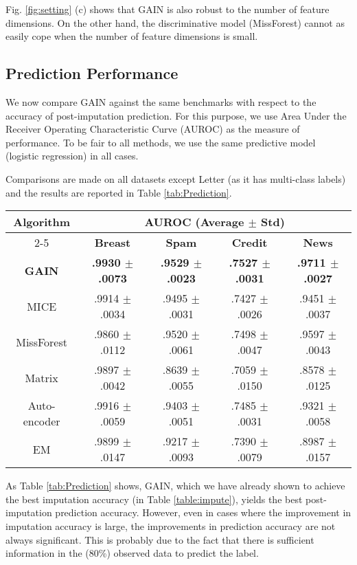 \documentclass{article}
\begin{document}
Fig. \ref{fig:setting} (c) shows that GAIN is also robust to the number of feature dimensions. On the other hand, the discriminative model (MissForest) cannot as easily cope when the number of feature dimensions is small.

\subsection{Prediction Performance}
We now compare GAIN against the same benchmarks with respect to the accuracy of post-imputation prediction. For this purpose, we use Area Under the Receiver Operating Characteristic Curve (AUROC) as the measure of performance. To be fair to all methods, we use the same predictive model (logistic regression) in all cases.

Comparisons are made on all datasets except Letter (as it has multi-class labels) and the results are reported in Table \ref{tab:Prediction}.

\begin{table*}[t!]
	\renewcommand{\arraystretch}{1.3}
	\caption{Prediction performance comparison}
	\label{tab:Prediction}
	\centering
	\begin{tabular}{|c|c|c|c|c|}
		\toprule
		\multirow{2}{*}{\textbf{Algorithm}}&\multicolumn{4}{c|}{\textbf{AUROC (Average $\pm$ Std)}}  \\
		\cmidrule{2-5}
		& \textbf{Breast} & \textbf{Spam} &  \textbf{Credit} & \textbf{News} \\
		\midrule
		\textbf{GAIN}& \textbf{.9930 $\pm$ .0073} & \textbf{.9529 $\pm$ .0023}  & \textbf{.7527 $\pm$ .0031} & \textbf{.9711 $\pm$ .0027}  \\
		\midrule
		MICE & .9914 $\pm$ .0034  & .9495 $\pm$ .0031 & .7427 $\pm$ .0026& .9451 $\pm$ .0037\\
		MissForest  & .9860 $\pm$ .0112&.9520 $\pm$ .0061&.7498 $\pm$ .0047& .9597 $\pm$ .0043 \\
		Matrix   & .9897 $\pm$ .0042 & .8639 $\pm$ .0055 & .7059 $\pm$ .0150 & .8578 $\pm$ .0125  \\
		Auto-encoder& .9916 $\pm$ .0059 & .9403 $\pm$ .0051 & .7485 $\pm$ .0031 & .9321 $\pm$ .0058 \\
		EM& .9899 $\pm$ .0147 & .9217 $\pm$ .0093 & .7390 $\pm$ .0079 & .8987 $\pm$ .0157 \\
		\bottomrule
	\end{tabular}
\end{table*}

As Table \ref{tab:Prediction} shows, GAIN, which we have already shown to achieve the best imputation accuracy (in Table \ref{table:impute}), yields the best post-imputation prediction accuracy. However, even in cases where the improvement in imputation accuracy is large, the  improvements in prediction accuracy are not always significant. This is probably due to the fact that there is sufficient information in the (80\%) observed data to predict the label.
\end{document}
